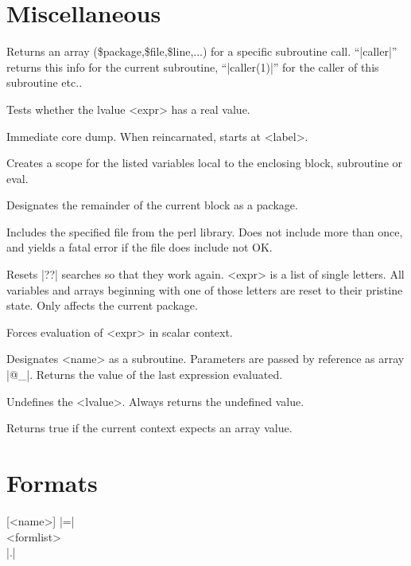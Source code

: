 \section{Miscellaneous} 

\begin{enum}{1cm}

Returns an array (\$package,\$file,\$line,...) for a specific subroutine
call. ``|caller|'' returns this info for the current subroutine,
``|caller(1)|'' for the caller of this subroutine etc..  

Tests whether the lvalue <expr> has a real value.

Immediate core dump. When reincarnated, starts at <label>.

Creates a scope for the listed variables local to the enclosing block,
subroutine or eval. 

Designates the remainder of the current block as a package.

Includes the specified file from the perl library. Does not include
more than once, and yields a fatal error if the file does include not OK. 

Resets |??| searches so that they work again. <expr> is a list of
single letters. All variables and arrays beginning with one of those
letters are reset to their pristine state.  Only affects the current
package.

Forces evaluation of <expr> in scalar context.

Designates <name> as a subroutine. Parameters are passed by reference
as array |@_|. Returns the value of the last expression evaluated. 

Undefines the <lvalue>. Always returns the undefined value.

Returns true if the current context expects an array value.

\end{enum}
\section{Formats} 

 [<name>] |=| \\
<formlist> \\
|.|

